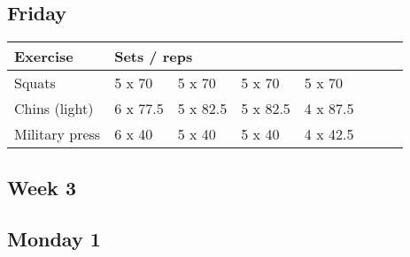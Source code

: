 \documentclass[12pt, a4paper]{article}%
\begin{document}
  \subsection*{\hspace{0.5em} Friday }


  \begin{tabular}{l|lllllll}
  \hspace{0.75em} \textbf{Exercise} & \multicolumn{ 7 }{l}{ \textbf{Sets / reps} } \\ \hline

            \hspace{0.75em} Squats
            & 5 x 70
            & 5 x 70
            & 5 x 70
            & 5 x 70
            & 
            & 
            & 
            \\


            \hspace{0.75em} Chins (light)
            & 6 x 77.5
            & 5 x 82.5
            & 5 x 82.5
            & 4 x 87.5
            & 
            & 
            & 
            \\


            \hspace{0.75em} Military press
            & 6 x 40
            & 5 x 40
            & 5 x 40
            & 4 x 42.5
            & 
            & 
            & 
            \\


  \end{tabular}


\clearpage \subsection*{\hspace{0.25em} Week 3 }
  \subsection*{\hspace{0.5em} Monday 1 }
\end{document}
